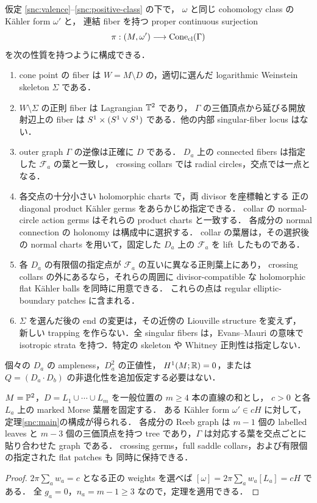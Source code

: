 \begin{theorem}
\label{snc:main}
仮定 \eqref{snc:valence}--\eqref{snc:positive-class} の下で，
$\omega$ と同じ cohomology class の Kähler form $\omega'$ と，
連結 fiber を持つ proper continuous surjection
\[
 \pi:(M,\omega')\longrightarrow\operatorname{Cone}_{\rm cl}(\Gamma)
\]
を次の性質を持つように構成できる．
\begin{enumerate}
\item cone point の fiber は $W=M\setminus D$ の，適切に選んだ
  logarithmic Weinstein skeleton $\Sigma$ である．
\item $W\setminus\Sigma$ の正則 fiber は Lagrangian $\mathbb T^2$ であり，
  $\Gamma$ の三価頂点から延びる開放射辺上の fiber は
  $S^1\times(S^1\vee S^1)$ である．他の内部 singular-fiber locus はない．
\item outer graph $\Gamma$ の逆像は正確に $D$ である．
  $D_a$ 上の connected fibers は指定した $\mathcal F_a$ の葉と一致し，
  crossing collars では radial circles，交点では一点となる．
\item 各交点の十分小さい holomorphic charts で，両 divisor を座標軸とする
  正の diagonal product Kähler germs をあらかじめ指定できる．
  collar の normal-circle action germs はそれらの product charts と一致する．
  各成分の normal connection の holonomy は構成中に選択する．
  collar の葉層は，その選択後の normal charts を用いて，固定した $D_a$ 上の
  $\mathcal F_a$ を lift したものである．
\item 各 $D_a$ の有限個の指定点が $\mathcal F_a$ の互いに異なる正則葉上にあり，
  crossing collars の外にあるなら，それらの周囲に divisor-compatible な
  holomorphic flat Kähler balls を同時に用意できる．
  これらの点は regular elliptic-boundary patches に含まれる．
\item $\Sigma$ を選んだ後の end の変更は，その近傍の Liouville structure を変えず，
  新しい trapping を作らない．全 singular fibers は，Evans--Mauri の意味で
  isotropic strata を持つ．特定の skeleton や Whitney 正則性は指定しない．
\end{enumerate}
個々の $D_a$ の ampleness，$D_a^2$ の正値性，
$H^1(M;\mathbb R)=0$，または $Q=(D_a\cdot D_b)$ の非退化性を追加仮定する必要はない．
\end{theorem}

\begin{corollary}
\label{comp:finite}
$M=\mathbb P^2$，$D=L_1\cup\cdots\cup L_m$ を一般位置の $m\geq4$ 本の直線の和とし，
$c>0$ と各 $L_a$ 上の marked Morse 葉層を固定する．
ある Kähler form $\omega'\in cH$ に対して，定理\ref{snc:main}の構成が得られる．
各成分の Reeb graph は $m-1$ 個の labelled leaves と $m-3$ 個の三価頂点を持つ
tree であり，$\Gamma$ は対応する葉を交点ごとに貼り合わせた graph である．
crossing germs，full saddle collars，および有限個の指定された flat patches も
同時に保持できる．
\end{corollary}
\begin{proof}
$2\pi\sum_a w_a=c$ となる正の weights を選べば
$[\omega]=2\pi\sum_a w_a[L_a]=cH$ である．
全 $g_a=0$，$n_a=m-1\geq3$ なので，定理を適用できる．
\end{proof}

